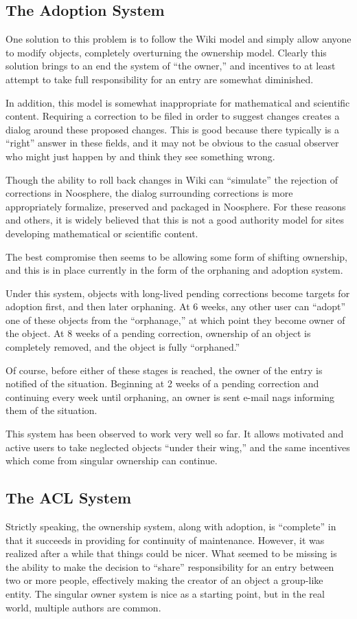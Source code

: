 \subsection*{The Adoption System}
One solution to this problem is to follow the Wiki model and simply allow anyone to modify objects, completely overturning the ownership model. Clearly this solution brings to an end the system of ``the owner,'' and incentives to at least attempt to take full responsibility for an entry are somewhat diminished.

In addition, this model is somewhat inappropriate for mathematical and scientific content. Requiring a correction to be filed in order to suggest changes creates a dialog around these proposed changes. This is good because there typically is a ``right'' answer in these fields, and it may not be obvious to the casual observer who might just happen by and think they see something wrong.

Though the ability to roll back changes in Wiki can ``simulate'' the rejection of corrections in Noosphere, the dialog surrounding corrections is more appropriately formalize, preserved and packaged in Noosphere. For these reasons and others, it is widely believed that this is not a good authority model for sites developing mathematical or scientific content.

The best compromise then seems to be allowing some form of shifting ownership, and this is in place currently in the form of the orphaning and adoption system.

Under this system, objects with long-lived pending corrections become targets for adoption first, and then later orphaning. At 6 weeks, any other user can ``adopt'' one of these objects from the ``orphanage,'' at which point they become owner of the object. At 8 weeks of a pending correction, ownership of an object is completely removed, and the object is fully ``orphaned.''

Of course, before either of these stages is reached, the owner of the entry is notified of the situation. Beginning at 2 weeks of a pending correction and continuing every week until orphaning, an owner is sent e-mail nags informing them of the situation.

This system has been observed to work very well so far. It allows motivated and active users to take neglected objects ``under their wing,'' and the same incentives which come from singular ownership can continue.

\subsection*{The ACL System}
Strictly speaking, the ownership system, along with adoption, is ``complete'' in that it succeeds in providing for continuity of maintenance. However, it was realized after a while that things could be nicer. What seemed to be missing is the ability to make the decision to ``share'' responsibility for an entry between two or more people, effectively making the creator of an object a group-like entity. The singular owner system is nice as a starting point, but in the real world, multiple authors are common.

